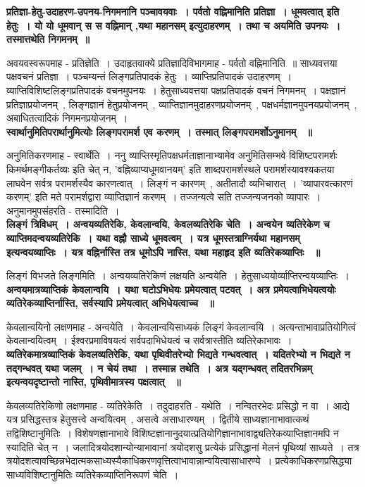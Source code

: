 {\bfseries प्रतिज्ञा-हेतु-उदाहरण-उपनय-निगमनानि पञ्चावयवाः~। पर्वतो वह्निमानिति प्रतिज्ञा~। धूमवत्वात् इति हेतुः~। यो यो धूमवान् स स वह्निमान् ,यथा महानसम् इत्युदाहरणम्~। तथा च अयमिति उपनयः~। तस्मात्तथेति निगमनम्~॥}\par
	अवयवस्वरूपमाह - प्रतिज्ञेति~। उदाहृतवाक्ये प्रतिज्ञादिविभागमाह - पर्वतो वह्निमानिति~॥ साध्यवत्तया पक्षवचनं प्रतिज्ञा~। पञ्चम्यन्तं लिङ्गप्रतिपादकं हेतुः~। व्याप्तिप्रतिपादकं उदाहरणम्~। व्याप्तिविशिष्टलिङ्गप्रतिपादकं वचनमुपनयः~। हेतुसाध्यवत्तया पक्षप्रतिपादकं वचनं निगमनम्~। पक्षज्ञानं प्रतिज्ञाप्रयोजनम्~, लिङ्गज्ञानं हेतुप्रयोजनम्~, व्याप्तिज्ञानमुदाहरणप्रयोजनम्~, पक्षधर्मज्ञानमुपनयप्रयोजनम्~, अबाधितत्वादिकं निगमनप्रयोजनम्~।\\[10pt]
{\bfseries स्वार्थानुमितिपरार्थानुमित्योः लिङ्गपरामर्श एव करणम्~। तस्मात् लिङ्गपरामर्शोऽनुमानम् ~॥}\par
	अनुमितिकरणमाह - स्वार्थेति~। ननु व्याप्तिस्मृतिपक्षधर्मताज्ञानाभ्यामेव अनुमितिसम्भवे विशिष्टपरामर्शः किमर्थमङ्गीकर्तव्यः इति चेत् न, ’वह्निव्याप्यधूमवानयम्’ इति शाब्दपरामर्शस्थले परामर्शस्यावश्यकतया लाघवेन सर्वत्र परामर्शस्यैव कारणत्वात्~। लिङ्गं न कारणम्~, अतीतादौ व्यभिचारात्~। ’व्यापारवत्कारणं करणम्’ इति मते परामर्शद्वारा व्याप्तिज्ञानं करणम्~। तज्जन्यत्वे सति तज्जन्यजनको व्यापारः~। अनुमानमुपसंहरति - तस्मादिति~।\\[10pt]
{\bfseries लिङ्गं त्रिविधम्~। अन्वयव्यतिरेकि, केवलान्वयि, केवलव्यतिरेकि चेति~। अन्वयेन व्यतिरेकेण च व्याप्तिमदन्वयव्यतिरेकि~। यथा वह्नौ साध्ये धूमवत्वम्~। यत्र धूमस्तत्राग्निर्यथा महानसम् इत्यन्वयव्याप्तिः~। यत्र वह्निर्नास्ति तत्र धूमोऽपि नास्ति, यथा महाहृद इति व्यतिरेकव्याप्तिः ~॥}\par
	लिङ्गं विभजते लिङ्गमिति~। अन्वयव्यतिरेकिणं लक्षयति अन्वयेति~। हेतुसाध्ययोर्व्याप्तिरन्वयव्याप्तिः~।\\[10pt]
{\bfseries अन्वयमात्रव्याप्तिकं केवलान्वयि~। यथा घटोऽभिधेयः प्रमेयत्वात् पटवत्~। अत्र प्रमेयत्वाभिधेयत्वयोः व्यतिरेकव्याप्तिर्नास्ति, सर्वस्यापि प्रमेयत्वात् अभिधेयत्वाच्च ~॥}\par
	केवलान्वयिनो लक्षणमाह - अन्वयेति~। केवलान्वयिसाध्यकं लिङ्गं केवलान्वयि~। अत्यन्ताभावाप्रतियोगित्वं केवलान्वयित्वम्~। ईश्वरप्रमाविषयत्वं सर्वपदाभिधेयत्वं च सर्वत्रास्तीति व्यतिरेकाभावः~।\\[10pt]
{\bfseries व्यतिरेकमात्रव्याप्तिकं केवलव्यतिरेकि, यथा पृथिवीतरेभ्यो भिद्यते गन्धवत्वात्~। यदितरेभ्यो न भिद्यते न तद्गन्धवत् यथा जलम्~। न चेयं तथा~। तस्मान्न तथेति~। अत्र यद्गन्धवत् तदितरभिन्नम् इत्यन्वयदृष्टान्तो नास्ति, पृथिवीमात्रस्य पक्षत्वात् ~॥}\par
	केवलव्यतिरेकिणो लक्षणमाह - व्यतिरेकेति~। तदुदाहरति - यथेति~। नन्वितरभेदः प्रसिद्धो न वा~। आद्ये यत्र प्रसिद्धस्तत्र हेतुसत्त्वे अन्वयित्वम्~, असत्वे असाधारण्यम्~। द्वितीये साध्यज्ञानाभावात्कथं तद्विशिष्टानुमितिः~। विशेषणज्ञानाभावे विशिष्टज्ञानानुदयात्प्रतियोगिज्ञानाभावाद्व्यतिरेकव्याप्तिज्ञानमपि न स्यादिति चेत् न~। जलादित्रयोदशान्योन्याभावानां त्रयोदशसु प्रत्येकं प्रसिद्धानां मेलनं पृथिव्यां साध्यते~। तत्र त्रयोदशत्वावच्छिन्नभेदात्मकसाध्यस्यैकाधिकरणवृत्तित्वाभावान्नान्वयित्वासाधारण्ये~। प्रत्येकाधिकरणप्रसिद्ध्या साध्यविशिष्टानुमितिः व्यतिरेकव्याप्तिनिरूपणं चेति~।\\[10pt]
